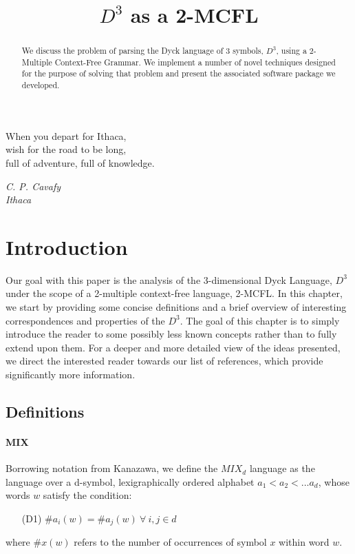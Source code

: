 \documentclass[nonatbib,numbers,10pt]{sigplanconf}
\title{$D^3$ as a 2-MCFL}
\begin{document}
\toappear{}

\maketitle

\begin{abstract}
We discuss the problem of parsing the Dyck language of 3 symbols, $D^3$, using a 2-Multiple Context-Free Grammar. We implement a number of novel techniques designed for the purpose of solving that problem and present the associated software package we developed.
\end{abstract}



\epigraph{When you depart for Ithaca,\\wish for the road to be long,\\full of adventure, full of knowledge.}{\textit{C. P. Cavafy\\ Ithaca}}

\section{Introduction}\label{sec1}
Our goal with this paper is the analysis of the 3-dimensional Dyck Language, $D^3$ under the scope of a 2-multiple context-free language, 2-MCFL. In this chapter, we start by providing some concise definitions and a brief overview of interesting correspondences and properties of the $D^3$. The goal of this chapter is to simply introduce the reader to some possibly less known concepts rather than to fully extend upon them. For a deeper and more detailed view of the ideas presented, we direct the interested reader towards our list of references, which provide significantly more information.
\subsection{Definitions}
\paragraph{MIX}
Borrowing notation from Kanazawa\cite{kanazawa}, we define the $MIX_d$ language as the language over a d-symbol, lexigraphically ordered alphabet $a_1 < a_2 < ... a_d$, whose words $w$ satisfy the condition:
\begin{itemize}
\item[(D1)]  $ \# a_i(w) = \# a_j(w) \ \forall \ i,j \in d $
\end{itemize}
where $ \#x(w)$ refers to the number of occurrences of symbol $x$ within word $w$.
\end{document}

